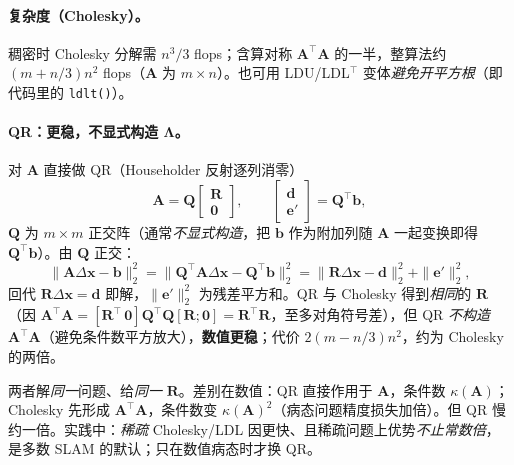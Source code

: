 \paragraph{复杂度（Cholesky）。}\cite{carlone2026handbook}
稠密时 Cholesky 分解需 $n^3/3$ flops；含算对称 $\mathbf{A}^\top\mathbf{A}$ 的一半，整算法约 $(m+n/3)n^2$ flops（$\mathbf{A}$ 为 $m\times n$）。也可用 LDU/LDL$^\top$ 变体\emph{避免开平方根}（即代码里的 \texttt{ldlt()}）。

\paragraph{QR：更稳，不显式构造 $\boldsymbol{\Lambda}$。}\cite{carlone2026handbook}
对 $\mathbf{A}$ 直接做 QR（Householder 反射逐列消零）
\begin{equation}
  \mathbf{A}=\mathbf{Q}\begin{bmatrix}\mathbf{R}\\\mathbf{0}\end{bmatrix},\qquad \begin{bmatrix}\mathbf{d}\\\mathbf{e}'\end{bmatrix}=\mathbf{Q}^\top\mathbf{b},
  \label{eq:nlopt-qr}
\end{equation}
$\mathbf{Q}$ 为 $m\times m$ 正交阵（通常\emph{不显式构造}，把 $\mathbf{b}$ 作为附加列随 $\mathbf{A}$ 一起变换即得 $\mathbf{Q}^\top\mathbf{b}$）。由 $\mathbf{Q}$ 正交：
\[
  \|\mathbf{A}\Delta\mathbf{x}-\mathbf{b}\|_2^2=\|\mathbf{Q}^\top\mathbf{A}\Delta\mathbf{x}-\mathbf{Q}^\top\mathbf{b}\|_2^2=\|\mathbf{R}\Delta\mathbf{x}-\mathbf{d}\|_2^2+\|\mathbf{e}'\|_2^2,
\]
回代 $\mathbf{R}\Delta\mathbf{x}=\mathbf{d}$ 即解，$\|\mathbf{e}'\|_2^2$ 为残差平方和。QR 与 Cholesky 得到\emph{相同}的 $\mathbf{R}$（因 $\mathbf{A}^\top\mathbf{A}=[\mathbf{R}^\top\,\mathbf{0}]\mathbf{Q}^\top\mathbf{Q}[\mathbf{R};\mathbf{0}]=\mathbf{R}^\top\mathbf{R}$，至多对角符号差），但 QR \emph{不构造} $\mathbf{A}^\top\mathbf{A}$（避免条件数平方放大），\textbf{数值更稳}；代价 $2(m-n/3)n^2$，约为 Cholesky 的两倍\cite{carlone2026handbook}。

\begin{insight}
两者解\emph{同一}问题、给\emph{同一} $\mathbf{R}$。差别在数值：QR 直接作用于 $\mathbf{A}$，条件数 $\kappa(\mathbf{A})$；Cholesky 先形成 $\mathbf{A}^\top\mathbf{A}$，条件数变 $\kappa(\mathbf{A})^2$（病态问题精度损失加倍）。但 QR 慢约一倍。实践中：\emph{稀疏} Cholesky/LDL 因更快、且稀疏问题上优势\emph{不止常数倍}，是多数 SLAM 的默认；只在数值病态时才换 QR\cite{carlone2026handbook,dellaert2017factor}。
\end{insight}

